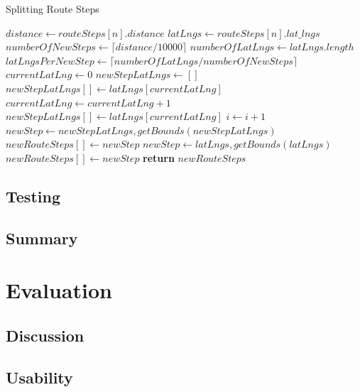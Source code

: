 \documentclass[authoryearcitations]{UoYCSproject}
\begin{document}
\begin{algorithm}
	\caption{Splitting Route Steps}
	\label{alg:algorithm}
	\begin{algorithmic}[1]
					\State $distance\gets routeSteps[n].distance$
					\State $latLngs \gets routeSteps[n].lat\_lngs$
						\State $numberOfNewSteps\gets \lceil distance/10000 \rceil$
						\State $numberOfLatLngs\gets latLngs.length$
						\State $latLngsPerNewStep\gets \lceil numberOfLatLngs/numberOfNewSteps \rceil$
						\State $currentLatLng\gets 0$
							\State $newStepLatLngs\gets []$
								\State $newStepLatLngs[]\gets latLngs[currentLatLng]$
								\State $currentLatLng\gets currentLatLng+1$
									\State $newStepLatLngs[]\gets latLngs[currentLatLng]$
										\State $i\gets i+1$
									\EndIf
								\EndIf
							\EndWhile
							\State $newStep \gets newStepLatLngs, getBounds(newStepLatLngs)$
							\State $newRouteSteps[] \gets newStep$
						\EndFor
					\Else
							\State $newStep \gets latLngs, getBounds(latLngs)$
							\State $newRouteSteps[] \gets newStep$
					\EndIf		
				\EndFor
				\State \textbf{return} $newRouteSteps$
		\EndFunction
	\end{algorithmic}
\end{algorithm}

\section{Testing}

\section{Summary}

\chapter{Evaluation}

\section{Discussion}

\section{Usability}
\end{document}
